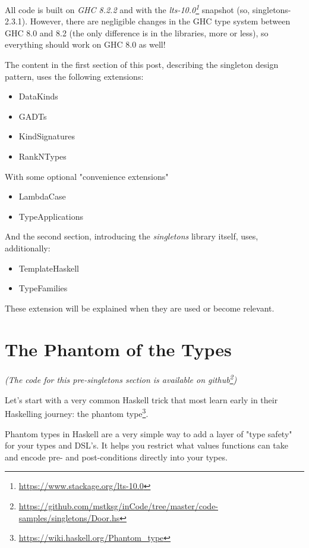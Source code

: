 \documentclass[]{article}
\renewcommand{\href}[2]{#2\footnote{\url{#1}}}
\begin{document}
All code is built on \emph{GHC 8.2.2} and with the
\emph{\href{https://www.stackage.org/lts-10.0}{lts-10.0}} snapshot (so,
singletons-2.3.1). However, there are negligible changes in the GHC type system
between GHC 8.0 and 8.2 (the only difference is in the libraries, more or less),
so everything should work on GHC 8.0 as well!

The content in the first section of this post, describing the singleton design
pattern, uses the following extensions:

\begin{itemize}
\tightlist
\item
  DataKinds
\item
  GADTs
\item
  KindSignatures
\item
  RankNTypes
\end{itemize}

With some optional "convenience extensions"

\begin{itemize}
\tightlist
\item
  LambdaCase
\item
  TypeApplications
\end{itemize}

And the second section, introducing the \emph{singletons} library itself, uses,
additionally:

\begin{itemize}
\tightlist
\item
  TemplateHaskell
\item
  TypeFamilies
\end{itemize}

These extension will be explained when they are used or become relevant.

\section{The Phantom of the Types}

\emph{(The code for this pre-singletons section is available
\href{https://github.com/mstksg/inCode/tree/master/code-samples/singletons/Door.hs}{on
github})}

Let's start with a very common Haskell trick that most learn early in their
Haskelling journey: the \href{https://wiki.haskell.org/Phantom_type}{phantom
type}.

Phantom types in Haskell are a very simple way to add a layer of "type safety"
for your types and DSL's. It helps you restrict what values functions can take
and encode pre- and post-conditions directly into your types.
\end{document}
